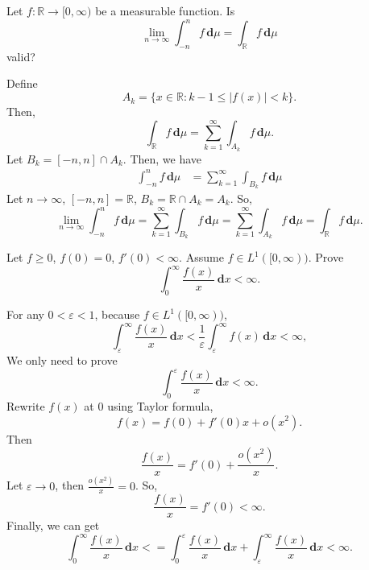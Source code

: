 \documentclass[12pt]{article}
\newenvironment{exercise}[1]{\begin{tcolorbox}[colback=black!15, colframe=black!80, breakable, title=#1]}{\end{tcolorbox}}
\newenvironment{solution}{\begin{tcolorbox}[colback=white, colframe=black!50, breakable, title=Solution. ]\setlength{\parskip}{0.8em}}{\end{tcolorbox}}
\newcommand{\der}{\,\mathbf{d}}
\begin{document}
    \begin{exercise}{7}
        Let $f : \mathbb{R} \to [0, \infty)$ be a measurable function. Is
        \[
            \lim_{n\to\infty}\int_{-n}^nf\der \mu=\int_\mathbb{R}f\der \mu
        \]
        valid? 
    \end{exercise}

    \begin{solution}
        Define
        \[
            A_k=\{x\in \mathbb{R}: k - 1 \leqslant |f(x)| < k\}. 
        \]
        Then, 
        \[
            \int_\mathbb{R}f\der \mu=\sum_{k = 1}^\infty\int_{A_k}f\der \mu. 
        \]
        Let $B_k=[-n, n]\cap A_k$. Then, we have
        \[
            \begin{aligned}
                \int_{-n}^{n} f\der \mu &= \sum_{k=1}^\infty\int_{B_k}f\der \mu
            \end{aligned}
        \]
        Let $n\to\infty$, $[-n,n]=\mathbb{R}$, $B_k=\mathbb{R}\cap A_k=A_k$. So, 
        \[
            \lim_{n\to\infty}\int_{-n}^{n} f\der \mu = \sum_{k=1}^\infty\int_{B_k}f\der \mu=\sum_{k = 1}^\infty\int_{A_k}f\der \mu=\int_\mathbb{R}f\der \mu. 
        \]
    \end{solution}

    \begin{exercise}{8}
        Let $f\geqslant0$, $f(0)=0$, $f'(0)<\infty$. Assume $f\in L^1([0,\infty))$. Prove
        \[
            \int_0^\infty\frac{f(x)}{x}\der x<\infty. 
        \]
    \end{exercise}

    \begin{solution}
        For any $0<\varepsilon<1$, because $f\in L^1([0,\infty))$, 
        \[
            \int_\varepsilon^\infty\frac{f(x)}{x}\der x<\frac{1}{\varepsilon}\int_\varepsilon^\infty f(x)\der x<\infty, 
        \]
        We only need to prove 
        \[
            \int_0^\varepsilon\frac{f(x)}{x}\der x<\infty. 
        \]
        Rewrite $f(x)$ at $0$ using Taylor formula, 
        \[
            f(x)=f(0)+f'(0)x+o(x^2). 
        \]
        Then
        \[
            \frac{f(x)}{x}=f'(0)+\frac{o(x^2)}{x}. 
        \]
        Let $\varepsilon\to 0$, then $\frac{o(x^2)}{x}=0$. So, 
        \[
            \frac{f(x)}{x}=f'(0)<\infty. 
        \]
        Finally, we can get
        \[
            \int_0^\infty\frac{f(x)}{x}\der x<=\int_0^\varepsilon\frac{f(x)}{x}\der x+\int_\varepsilon^\infty\frac{f(x)}{x}\der x<\infty. 
        \]
    \end{solution}
\end{document}
